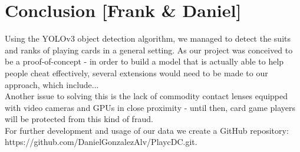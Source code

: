 \documentclass[a4paper]{article}
\begin{document}
\section{Conclusion  [Frank \& Daniel]}
Using the YOLOv3 object detection algorithm, we managed to detect the suits and ranks of playing cards in a general setting. As our project was conceived to be a proof-of-concept - in order to build a model that is actually able to help people cheat effectively, several extensions would need to be made to our approach, which include... \\ Another issue to solving this is the lack of commodity contact lenses equipped with video cameras and GPUs in close proximity - until then, card game players will be protected from this kind of fraud.
\\ For further development and usage of our data we create a GitHub repository: \\https://github.com/DanielGonzalezAlv/PlaycDC.git.

\newpage
 


\end{document}
